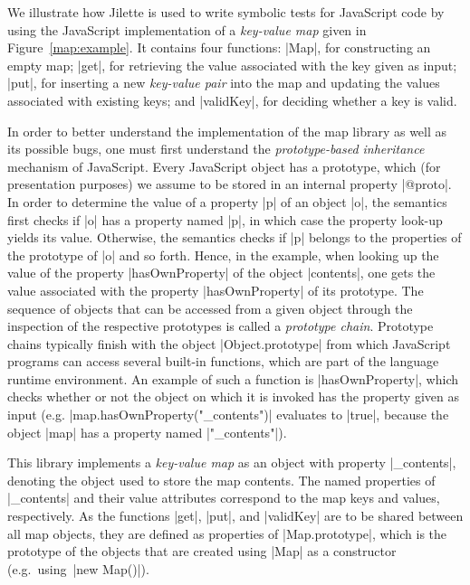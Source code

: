 We illustrate how Jilette is used to write symbolic tests for JavaScript code by using the JavaScript implementation 
of a  \emph{key-value map} given in Figure~\ref{map:example}. 
It contains four functions: 
\jsinline|Map|, for constructing an empty map;
\jsinline|get|, for retrieving the value associated with the key given as input;
\jsinline|put|, for inserting a new \emph{key-value pair} into the map and updating the values associated with existing keys; and
\jsinline|validKey|, for deciding whether a key is valid.

In order to better understand the implementation of the map library as well as its possible bugs, 
one must first understand the \emph{prototype-based inheritance} mechanism of JavaScript. 
Every JavaScript object has a prototype, which (for presentation purposes) we assume to 
be stored  in an internal property \jsinline|@proto|. In order to determine the value of a property
\jsinline|p| of an object \jsinline|o|, the semantics first checks if \jsinline|o| has a 
property named \jsinline|p|, in which case the property look-up yields its value. Otherwise, the 
semantics checks if \jsinline|p| belongs to the properties of the prototype of \jsinline|o| and so 
forth. Hence, in the example, when looking up the value of the property \jsinline|hasOwnProperty|
of the object \jsinline|contents|, one gets the value associated with the property  \jsinline|hasOwnProperty|
of its prototype.
The sequence of objects that can be accessed from a given object through the inspection 
of the respective prototypes is called a \emph{prototype chain}.
Prototype chains typically finish with the object \jsinline|Object.prototype| from which JavaScript 
programs can access several built-in functions, which are part of the language runtime environment.
An example of such a function is \jsinline|hasOwnProperty|, which checks whether or not the object 
on which it is invoked has the property given as input (e.g. \jsinline|map.hasOwnProperty("_contents")| 
evaluates to \jsinline|true|, because the object \jsinline|map| has a property named \jsinline|"_contents"|). 



This library implements a \emph{key-value map} as an object with property \jsinline|_contents|, denoting the object used to store the map contents.  
The named properties of \jsinline|_contents| and their value attributes correspond to the map keys and values, respectively.
As the functions \jsinline|get|, \jsinline|put|, and \jsinline|validKey| are to be shared between all map 
objects, they are defined as properties of \jsinline|Map.prototype|, which is the prototype 
of the objects that are created using \jsinline|Map| as a constructor (e.g.~using~\jsinline|new Map()|). 

